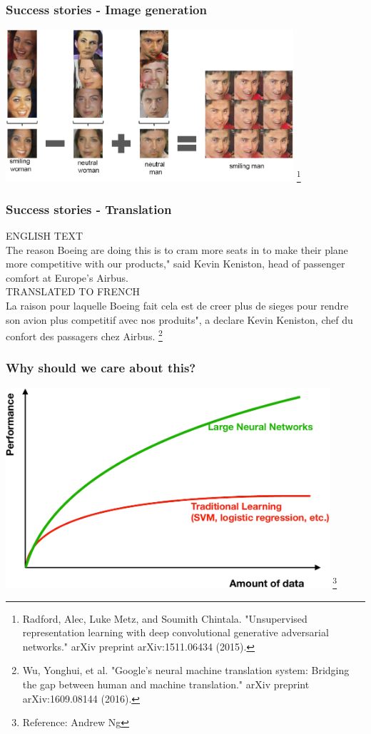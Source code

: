 \documentclass[]{article}
\newcommand\blfootnote[1]{%
  \begingroup
  \renewcommand\thefootnote{}\footnote{#1}%
  \addtocounter{footnote}{-1}%
  \endgroup
}
\begin{document}
\begin{frame}
	\frametitle{Success stories - Image generation}
	\centering \includegraphics[width=0.8\textwidth]{imggen.pdf}\blfootnote{Radford, Alec, Luke Metz, and Soumith Chintala. "Unsupervised representation learning with deep convolutional generative adversarial networks." arXiv preprint arXiv:1511.06434 (2015).}
\end{frame}

\begin{frame}
	\frametitle{Success stories - Translation}

ENGLISH TEXT\\
The reason Boeing are doing this is to cram more seats in to make their plane
more competitive with our products," said Kevin Keniston, head of passenger
comfort at Europe's Airbus.
\\[1em]
TRANSLATED TO FRENCH\\
La raison pour laquelle Boeing fait cela est de creer plus de sieges pour rendre
son avion plus competitif avec nos produits", a declare Kevin Keniston, chef
du confort des passagers chez Airbus. \blfootnote{Wu, Yonghui, et al. "Google's neural machine translation system: Bridging the gap between human and machine translation." arXiv preprint arXiv:1609.08144 (2016).}

\end{frame}

\begin{frame}
	\frametitle{Why should we care about this?}
	\centering \includegraphics[width=0.9\textwidth]{Fig1.pdf}\blfootnote{Reference: Andrew Ng}
\end{frame}
\end{document}
